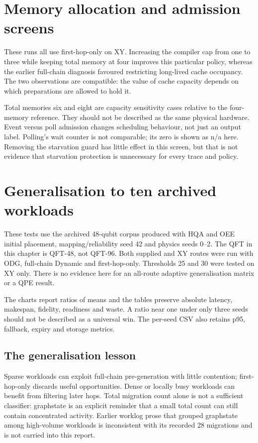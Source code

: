 \documentclass[11pt,a4paper,oneside]{report}
\begin{document}
\chapter{Memory allocation and admission screens}

These runs all use first-hop-only on XY. Increasing the compiler cap from one to three while keeping total memory at four improves this particular policy, whereas the earlier full-chain diagnosis favoured restricting long-lived cache occupancy. The two observations are compatible: the value of cache capacity depends on which preparations are allowed to hold it.

Total memories six and eight are capacity sensitivity cases relative to the four-memory reference. They should not be described as the same physical hardware. Event versus poll admission changes scheduling behaviour, not just an output label. Polling's wait counter is not comparable; its zero is shown as n/a here. Removing the starvation guard has little effect in this screen, but that is not evidence that starvation protection is unnecessary for every trace and policy.

\chapter{Generalisation to ten archived workloads}
These tests use the archived 48-qubit corpus produced with HQA and OEE initial placement, mapping/reliability seed 42 and physics seeds 0--2. The QFT in this chapter is QFT-48, not QFT-96. Both supplied and XY routes were run with ODG, full-chain Dynamic and first-hop-only. Thresholds 25 and 30 were tested on XY only. There is no evidence here for an all-route adaptive generalisation matrix or a QPE result.

The charts report ratios of means and the tables preserve absolute latency, makespan, fidelity, readiness and waste. A ratio near one under only three seeds should not be described as a universal win. The per-seed CSV also retains p95, fallback, expiry and storage metrics.


\section{The generalisation lesson}
Sparse workloads can exploit full-chain pre-generation with little contention; first-hop-only discards useful opportunities. Dense or locally busy workloads can benefit from filtering later hops. Total migration count alone is not a sufficient classifier: graphstate is an explicit reminder that a small total count can still contain concentrated activity. Earlier worklog prose that grouped graphstate among high-volume workloads is inconsistent with its recorded 28 migrations and is not carried into this report.
\end{document}
